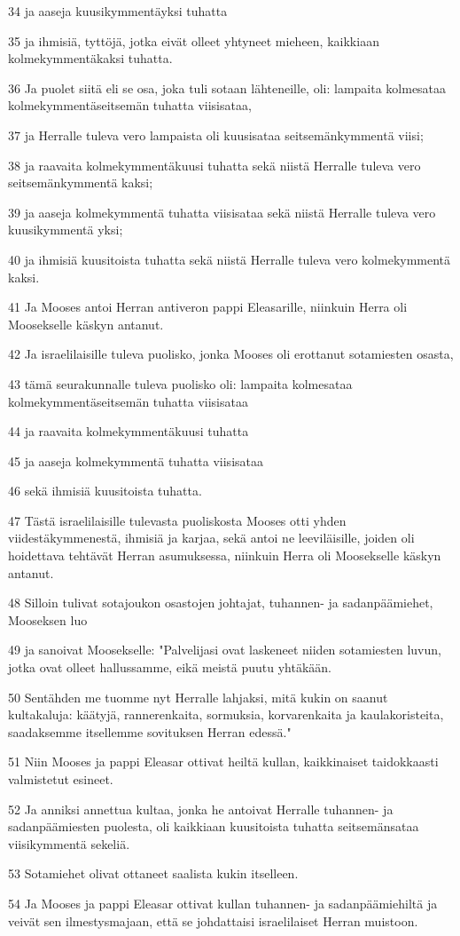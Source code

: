\par 34 ja aaseja kuusikymmentäyksi tuhatta
\par 35 ja ihmisiä, tyttöjä, jotka eivät olleet yhtyneet mieheen, kaikkiaan kolmekymmentäkaksi tuhatta.
\par 36 Ja puolet siitä eli se osa, joka tuli sotaan lähteneille, oli: lampaita kolmesataa kolmekymmentäseitsemän tuhatta viisisataa,
\par 37 ja Herralle tuleva vero lampaista oli kuusisataa seitsemänkymmentä viisi;
\par 38 ja raavaita kolmekymmentäkuusi tuhatta sekä niistä Herralle tuleva vero seitsemänkymmentä kaksi;
\par 39 ja aaseja kolmekymmentä tuhatta viisisataa sekä niistä Herralle tuleva vero kuusikymmentä yksi;
\par 40 ja ihmisiä kuusitoista tuhatta sekä niistä Herralle tuleva vero kolmekymmentä kaksi.
\par 41 Ja Mooses antoi Herran antiveron pappi Eleasarille, niinkuin Herra oli Moosekselle käskyn antanut.
\par 42 Ja israelilaisille tuleva puolisko, jonka Mooses oli erottanut sotamiesten osasta,
\par 43 tämä seurakunnalle tuleva puolisko oli: lampaita kolmesataa kolmekymmentäseitsemän tuhatta viisisataa
\par 44 ja raavaita kolmekymmentäkuusi tuhatta
\par 45 ja aaseja kolmekymmentä tuhatta viisisataa
\par 46 sekä ihmisiä kuusitoista tuhatta.
\par 47 Tästä israelilaisille tulevasta puoliskosta Mooses otti yhden viidestäkymmenestä, ihmisiä ja karjaa, sekä antoi ne leeviläisille, joiden oli hoidettava tehtävät Herran asumuksessa, niinkuin Herra oli Moosekselle käskyn antanut.
\par 48 Silloin tulivat sotajoukon osastojen johtajat, tuhannen- ja sadanpäämiehet, Mooseksen luo
\par 49 ja sanoivat Moosekselle: "Palvelijasi ovat laskeneet niiden sotamiesten luvun, jotka ovat olleet hallussamme, eikä meistä puutu yhtäkään.
\par 50 Sentähden me tuomme nyt Herralle lahjaksi, mitä kukin on saanut kultakaluja: käätyjä, rannerenkaita, sormuksia, korvarenkaita ja kaulakoristeita, saadaksemme itsellemme sovituksen Herran edessä."
\par 51 Niin Mooses ja pappi Eleasar ottivat heiltä kullan, kaikkinaiset taidokkaasti valmistetut esineet.
\par 52 Ja anniksi annettua kultaa, jonka he antoivat Herralle tuhannen- ja sadanpäämiesten puolesta, oli kaikkiaan kuusitoista tuhatta seitsemänsataa viisikymmentä sekeliä.
\par 53 Sotamiehet olivat ottaneet saalista kukin itselleen.
\par 54 Ja Mooses ja pappi Eleasar ottivat kullan tuhannen- ja sadanpäämiehiltä ja veivät sen ilmestysmajaan, että se johdattaisi israelilaiset Herran muistoon.

